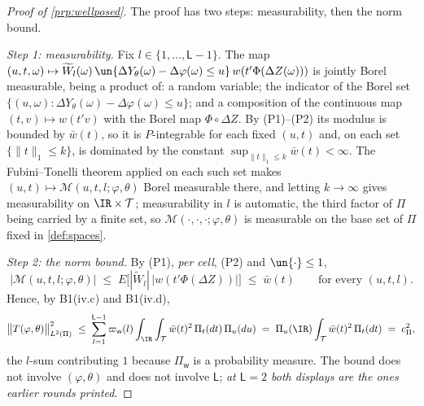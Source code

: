 
\begin{proof}[Proof of \cref{prp:wellposed}]
The proof has two steps: measurability, then the norm bound.

\emph{Step 1: measurability.}
Fix $l\in\{1,\dots,\mathsf L-1\}$. The map
$(u,t,\omega)\mapsto\widetilde W_l(\omega)\,\un\{\Delta Y_\theta(\omega)-\Delta\varphi(\omega)\le u\}\,w(t'\Phi(\Delta Z(\omega)))$
is jointly Borel measurable, being a product of: a random variable; the indicator of the Borel set
$\{(u,\omega):\Delta Y_\theta(\omega)-\Delta\varphi(\omega)\le u\}$; and a composition of the continuous
map $(t,v)\mapsto w(t'v)$ with the Borel map $\Phi\circ\Delta Z$. By (P1)--(P2) its modulus is bounded by
$\bar w(t)$, so it is $P$-integrable for each fixed $(u,t)$ and, on each set $\{\|t\|_1\le k\}$, is
dominated by the constant $\sup_{\|t\|_1\le k}\bar w(t)<\infty$. The Fubini--Tonelli theorem applied on
each such set makes $(u,t)\mapsto\mathcal M(u,t,l;\varphi,\theta)$ Borel measurable there, and letting
$k\to\infty$ gives measurability on $\IR\times\mathcal T$; measurability in $l$ is automatic, the third
factor of $\Pi$ being carried by a finite set, so $\mathcal M(\cdot,\cdot,\cdot;\varphi,\theta)$ is
measurable on the base set of $\Pi$ fixed in \cref{def:spaces}.

\emph{Step 2: the norm bound.}
By (P1), \emph{per cell}, (P2) and $\un\{\cdot\}\le1$,
\[
\big|\mathcal M(u,t,l;\varphi,\theta)\big|
\;\le\;E\big[|\widetilde W_l|\,\big|w(t'\Phi(\Delta Z))\big|\big]\;\le\;\bar w(t)
\qquad\text{for every }(u,t,l).
\]
Hence, by B1(iv.c) and B1(iv.d),
\[
\big\|T(\varphi,\theta)\big\|_{L^{2}(\Pi)}^{2}
\;\le\;\sum_{l=1}^{\mathsf L-1}\varpi_{\mathsf w}(l)\int_{\IR}\int_{\mathcal T}\bar w(t)^{2}\,\Pi_t(dt)\,\Pi_u(du)
\;=\;\Pi_u(\IR)\int_{\mathcal T}\bar w(t)^{2}\,\Pi_t(dt)\;=\;c_\Pi^{2},
\]
the $l$-sum contributing $1$ because $\Pi_{\mathsf w}$ is a probability measure.
The bound does not involve $(\varphi,\theta)$ and does not involve $\mathsf L$; \emph{at $\mathsf L=2$
both displays are the ones earlier rounds printed}.
\end{proof}

